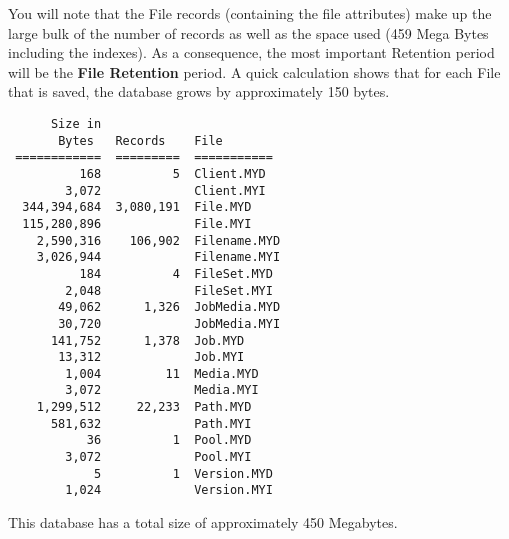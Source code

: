 You will note that the File records (containing the file attributes) make up
the large bulk of the number of records as well as the space used (459 Mega
Bytes including the indexes). As a consequence, the most important Retention
period will be the {\bf File Retention} period. A quick calculation shows that
for each File that is saved, the database grows by approximately 150 bytes.

\footnotesize
\begin{verbatim}
      Size in
       Bytes   Records    File
 ============  =========  ===========
          168          5  Client.MYD
        3,072             Client.MYI
  344,394,684  3,080,191  File.MYD
  115,280,896             File.MYI
    2,590,316    106,902  Filename.MYD
    3,026,944             Filename.MYI
          184          4  FileSet.MYD
        2,048             FileSet.MYI
       49,062      1,326  JobMedia.MYD
       30,720             JobMedia.MYI
      141,752      1,378  Job.MYD
       13,312             Job.MYI
        1,004         11  Media.MYD
        3,072             Media.MYI
    1,299,512     22,233  Path.MYD
      581,632             Path.MYI
           36          1  Pool.MYD
        3,072             Pool.MYI
            5          1  Version.MYD
        1,024             Version.MYI
\end{verbatim}
\normalsize

This database has a total size of approximately 450 Megabytes.
